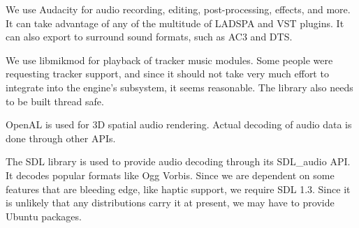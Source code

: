 

\startitemize[4]

We use Audacity for audio recording, editing, post-processing, effects, and more. It can take advantage of any of the multitude of LADSPA and VST plugins. It can also export to surround sound formats, such as AC3 and DTS.


We use libmikmod for playback of tracker music modules. Some people were requesting tracker support, and since it should not take very much effort to integrate into the engine's {\about[AudioManager]} subsystem, it seems reasonable. The library also needs to be built thread safe.


OpenAL is used for 3D spatial audio rendering. Actual decoding of audio data is done through other APIs.


The SDL library is used to provide audio decoding through its SDL_audio API. It decodes popular formats like Ogg Vorbis. Since we are dependent on some features that are bleeding edge, like haptic support, we require SDL 1.3. Since it is unlikely that any distributions carry it at present, we may have to provide Ubuntu packages.
\stopitemize

